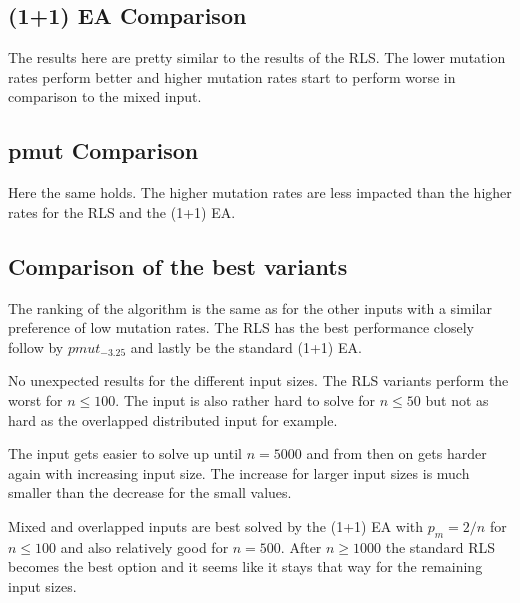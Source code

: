 \subsection{(1+1) EA Comparison}




The results here are pretty similar to the results of the RLS.
The lower mutation rates perform better and higher mutation rates start to perform worse in comparison to the mixed input.
\subsection{pmut Comparison}




Here the same holds.
The higher mutation rates are less impacted than the higher rates for the RLS and the (1+1) EA.
\subsection{Comparison of the best variants}




The ranking of the algorithm is the same as for the other inputs with a similar preference of low mutation rates.
The RLS has the best performance closely follow by $pmut_{-3.25}$ and lastly be the standard (1+1) EA.



No unexpected results for the different input sizes.
The RLS variants perform the worst for $n\le 100$.
The input is also rather hard to solve for $n\le50$ but not as hard as the overlapped distributed input for example.



The input gets easier to solve up until $n=5000$ and from then on gets harder again with increasing input size.
The increase for larger input sizes is much smaller than the decrease for the small values.



Mixed and overlapped inputs are best solved by the (1+1) EA with $p_m=2/n$ for $n\le100$ and also relatively good for $n=500$.
After $n\ge1000$ the standard RLS becomes the best option and it seems like it stays that way for the remaining input sizes.
